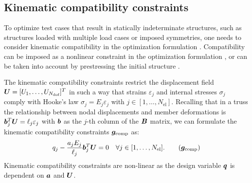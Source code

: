 \subsection{Kinematic compatibility constraints}
To optimize test cases that result in statically indeterminate structures, such as structures loaded with multiple load cases or imposed symmetries, one needs to consider kinematic compatibility in the optimization formulation . Compatibility can be imposed as a nonlinear constraint in the optimization formulation , or can be taken into account by prestressing the initial structure .

The kinematic compatibility constraints restrict the displacement field $\bm{U} = [U_1, \ldots,U_{N_{\text{dof}}}]^T$ in such a way that strains $\varepsilon_j$ and internal stresses $\sigma_j$ comply with Hooke's law $\sigma_j = E_j \varepsilon_j$ with $j \in [1,\ldots, N_{\text{el}}]$. Recalling that in a truss the relationship between nodal displacements and member deformations is $\bm{b}^T_j \bm{U} = \ell_j \varepsilon_j$ with $\bm{b}$ as the $j$-th column of the $\bm{B}$ matrix, we can formulate the kinematic compatibility constraints $\bm{g}_{\textrm{comp}}$ as:
\begin{equation}
\label{eq:compatib}
     q_j - \frac{a_j E_j}{\ell_j} \vect{b}_j^T\vect{U}  = 0  \quad \forall j \in [1,\ldots, N_{\text{el}}].
     \tag{$\vect{g}_{\textrm{comp}}$}
\end{equation}
Kinematic compatibility constraints are non-linear as the design variable $\bm{q}$ is dependent on $\bm{a}$ and $\bm{U}$.


